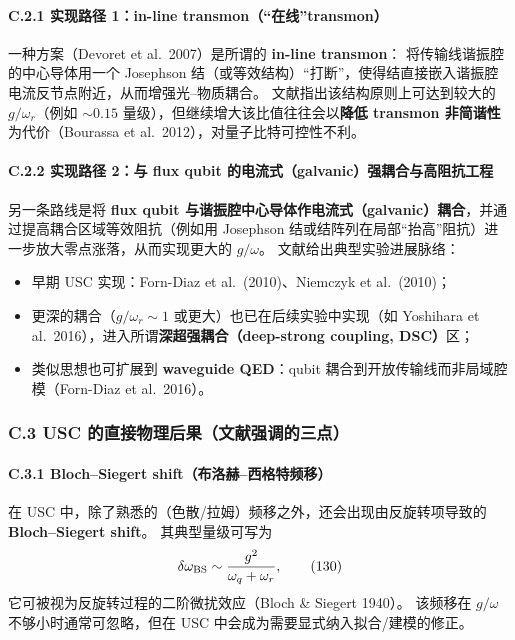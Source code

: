 \documentclass[12pt,a4paper,oneside]{ctexbook}
\let\oldparagraph\paragraph
\renewcommand{\paragraph}[1]{\oldparagraph{#1}\mbox{}}
\begin{document}
\paragraph{C.2.1 实现路径 1：in-line transmon（“在线”transmon）}
一种方案（Devoret et al.\ 2007）是所谓的 \textbf{in-line transmon}：
将传输线谐振腔的中心导体用一个 Josephson 结（或等效结构）“打断”，使得结直接嵌入谐振腔电流反节点附近，从而增强光--物质耦合。
文献指出该结构原则上可达到较大的 $g/\omega_r$（例如 $\sim 0.15$ 量级），但继续增大该比值往往会以\textbf{降低 transmon 非简谐性}为代价（Bourassa et al.\ 2012），对量子比特可控性不利。

\paragraph{C.2.2 实现路径 2：与 flux qubit 的电流式（galvanic）强耦合与高阻抗工程}
另一条路线是将 \textbf{flux qubit 与谐振腔中心导体作电流式（galvanic）耦合}，并通过提高耦合区域等效阻抗（例如用 Josephson 结或结阵列在局部“抬高”阻抗）进一步放大零点涨落，从而实现更大的 $g/\omega$。
文献给出典型实验进展脉络：
\begin{itemize}
  \item 早期 USC 实现：Forn-Diaz et al.\ (2010)、Niemczyk et al.\ (2010)；
  \item 更深的耦合（$g/\omega_r\sim 1$ 或更大）也已在后续实验中实现（如 Yoshihara et al.\ 2016），进入所谓\textbf{深超强耦合（deep-strong coupling, DSC）}区；
  \item 类似思想也可扩展到 \textbf{waveguide QED}：qubit 耦合到开放传输线而非局域腔模（Forn-Diaz et al.\ 2016）。
\end{itemize}

\subsubsection{C.3 USC 的直接物理后果（文献强调的三点）}

\paragraph{C.3.1 Bloch--Siegert shift（布洛赫--西格特频移）}
在 USC 中，除了熟悉的（色散/拉姆）频移之外，还会出现由反旋转项导致的 \textbf{Bloch--Siegert shift}。
其典型量级可写为
\begin{equation}
\delta\omega_{\rm BS}\sim \frac{g^2}{\omega_q+\omega_r},
\tag{130}
\end{equation}
它可被视为反旋转过程的二阶微扰效应（Bloch \& Siegert 1940）。
该频移在 $g/\omega$ 不够小时通常可忽略，但在 USC 中会成为需要显式纳入拟合/建模的修正。
\end{document}
